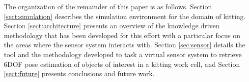 




The organization of the remainder of this paper is as follows. Section \ref{sect:simulation} describes the simulation environment for the domain of kitting. Section \ref{sect:architecture} presents an overview of the knowledge driven methodology that has been developed for this effort with a particular focus on the areas where the sensor system interacts with.  Section \ref{sec:sensor} details the tool and the methodology developed to task a virtual sensor system to retrieve 6DOF pose estimation of objects of interest in a kitting work cell, and Section \ref{sect:future} presents conclusions and future work.